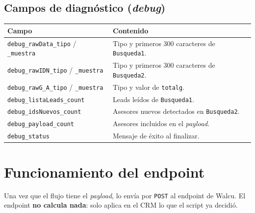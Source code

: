 \documentclass[11pt,a4paper]{article}
\newcommand{\code}[1]{\texttt{#1}}
\begin{document}
\subsection{Campos de diagnóstico (\emph{debug})}
\begin{longtable}{@{}p{5.6cm}p{9.2cm}@{}}
\toprule
\textbf{Campo} & \textbf{Contenido} \\
\midrule
\endhead
\code{debug\_rawData\_tipo} / \code{\_muestra} & Tipo y primeros 300 caracteres de \code{Busqueda1}. \\
\code{debug\_rawIDN\_tipo} / \code{\_muestra} & Tipo y primeros 300 caracteres de \code{Busqueda2}. \\
\code{debug\_rawG\_A\_tipo} / \code{\_muestra} & Tipo y valor de \code{totalg}. \\
\code{debug\_listaLeads\_count} & Leads leídos de \code{Busqueda1}. \\
\code{debug\_idsNuevos\_count} & Asesores nuevos detectados en \code{Busqueda2}. \\
\code{debug\_payload\_count} & Asesores incluidos en el \emph{payload}. \\
\code{debug\_status} & Mensaje de éxito al finalizar. \\
\bottomrule
\end{longtable}

\section{Funcionamiento del endpoint}

Una vez que el flujo tiene el \emph{payload}, lo envía por \code{POST} al endpoint de Walcu. El endpoint \textbf{no calcula nada}: solo aplica en el CRM lo que el script ya decidió.
\end{document}
